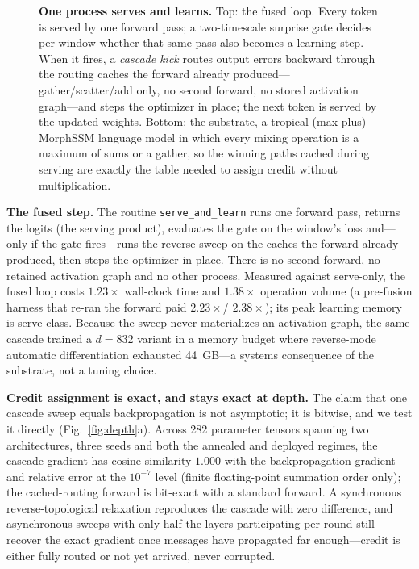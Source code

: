 \documentclass[sn-nature]{sn-jnl}   %
\newcommand{\heading}[1]{\vspace{4pt}\noindent\textbf{#1}\hspace{0.6em}}
\begin{document}
\begin{figure}[t]
\caption{\textbf{One process serves and learns.} Top: the fused loop. Every
token is served by one forward pass; a two-timescale surprise gate decides
per window whether that same pass also becomes a learning step. When it fires,
a \emph{cascade kick} routes output errors backward through the routing caches
the forward already produced---gather/scatter/add only, no second forward, no
stored activation graph---and steps the optimizer in place; the next token is
served by the updated weights. Bottom: the substrate, a tropical (max-plus)
MorphSSM language model in which every mixing operation is a maximum of sums or
a gather, so the winning paths cached during serving are exactly the table
needed to assign credit without multiplication.}
\label{fig:loop}
\end{figure}

\heading{The fused step.}
The routine \texttt{serve\_and\_learn} runs one forward pass, returns the
logits (the serving product), evaluates the gate on the window's loss and---only
if the gate fires---runs the reverse sweep on the caches the forward already
produced, then steps the optimizer in place. There is no second forward, no
retained activation graph and no other process. Measured against serve-only,
the fused loop costs $1.23\times$ wall-clock time and $1.38\times$ operation
volume (a pre-fusion harness that re-ran the forward paid $2.23\times$/%
$2.38\times$); its peak learning memory is serve-class. Because the sweep never
materializes an activation graph, the same cascade trained a $d{=}832$ variant
in a memory budget where reverse-mode automatic differentiation exhausted
44~GB---a systems consequence of the substrate, not a tuning choice.

\heading{Credit assignment is exact, and stays exact at depth.}
The claim that one cascade sweep equals backpropagation is not asymptotic; it is
bitwise, and we test it directly (Fig.~\ref{fig:depth}a). Across 282 parameter
tensors spanning two architectures, three seeds and both the annealed and
deployed regimes, the cascade gradient has cosine similarity $1.000$ with the
backpropagation gradient and relative error at the $10^{-7}$ level (finite
floating-point summation order only); the cached-routing forward is bit-exact
with a standard forward. A synchronous reverse-topological relaxation reproduces
the cascade with zero difference, and asynchronous sweeps with only half the
layers participating per round still recover the exact gradient once messages
have propagated far enough---credit is either fully routed or not yet arrived,
never corrupted.
\end{document}
